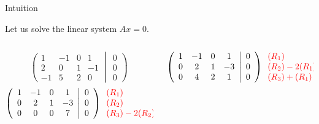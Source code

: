 \documentclass{beamer}
\begin{document}
\begin{frame}[t]{Intuition}
	\grid

	\vspace{-0.3cm}
	Let us solve the linear system $Ax = 0$.
	\begin{columns}
		\hspace*{-0.7cm}
		\begin{column}{0.40\textwidth}
			$$
			\left(
				\begin{array}{cccc}
					1  & -1 & 0 & 1 \\
					2  & 0 & 1 & -1 \\
					-1  & 5 & 2 & 0 
				\end{array}
				\middle|
				\begin{array}{c}
					0 \\
					0 \\
					0
				\end{array}
			\right)
			$$
			$$
			\left(
				\begin{array}{cccc}
					1  & -1 & 0 & 1 \\
					0  & 2 & 1 & -3 \\
					0  & 0 & 0 & 7 
				\end{array}
				\middle|
				\begin{array}{c}
					0 \\
					0 \\
					0
				\end{array}
			\right)
			{\color{red}
				\begin{array}{l}
					(R_1)\\
					(R_2)\\
					(R_3) -2 (R_2)
				\end{array}
			}
			$$
		\end{column}
		\begin{column}{0.55\textwidth}
			\vspace{-1.9cm}
			$$
			\left(
				\begin{array}{cccc}
					1  & -1 & 0 & 1 \\
					0  & 2 & 1 & -3 \\
					0  & 4 & 2 & 1 
				\end{array}
				\middle|
				\begin{array}{c}
					0 \\
					0 \\
					0
				\end{array}
			\right)
			{\color{red}
				\begin{array}{l}
					(R_1)\\
					(R_2) - 2 (R_1) \\
					(R_3) + (R_1)
				\end{array}
			}
			$$
		\end{column}
	\end{columns}


\end{frame}
\end{document}
